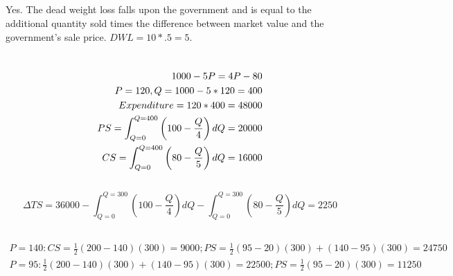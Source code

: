 \documentclass{article}
\begin{document}
	\subsection[j]{}
		Yes. The dead weight loss falls upon the government and is equal to the additional quantity sold times the difference between market value and the government's sale price. $DWL = 10 * .5 = 5.$
\section[8]{}
	\subsection[a]{}
		\begin{align}
			\setcounter{equation}{0}
			1000-5P = 4P-80 \\
			P = 120, Q=1000-5*120=400\\
			Expenditure = 120*400 = 48000\\
			PS = \int_{Q=0}^{Q=400}\left(100-\frac{Q}{4}\right)dQ=20000 \\
			CS = \int_{Q=0}^{Q=400} \left ( 80 - \frac{Q}{5} \right )dQ = 16000			
		\end{align}
	\subsection[b]{}
		$$ \Delta TS = 36000 - \int_{Q=0}^{Q=300}\left(100-\frac{Q}{4}\right)dQ - \int_{Q=0}^{Q=300} \left ( 80 - \frac{Q}{5} \right )dQ = 2250 $$
	\subsection[c]{}
		\begin{align*}
			P=140: CS =  \frac{1}{2}(200-140)(300) = 9000; PS = \frac{1}{2} (95-20)(300)+(140-95)(300)=24750\\
			P=95:  \frac{1}{2}(200-140)(300)+(140-95)(300) = 22500; PS = \frac{1}{2} (95-20)(300)=11250
		\end{align*}
\end{document}
